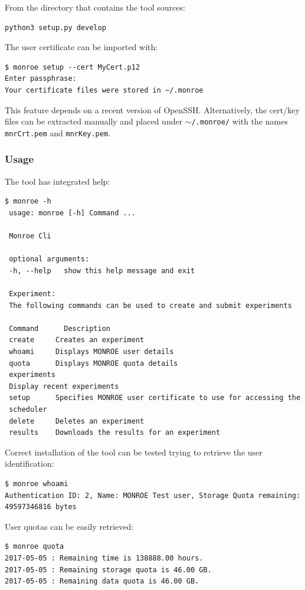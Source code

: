 \documentclass[a4paper,10pt]{article}
\newcommand{\VerbatimFont}{\footnotesize}
\newcommand{\identifier}[1]{{\texttt{\small{#1}}}}
\begin{document}
\noindent From the directory that contains the tool sources:
{\VerbatimFont\begin{verbatim}
python3 setup.py develop
\end{verbatim}}

\noindent The user certificate can be imported with:
{\VerbatimFont\begin{verbatim}
$ monroe setup --cert MyCert.p12
Enter passphrase:
Your certificate files were stored in ~/.monroe
\end{verbatim}}
This feature depends on a recent version of OpenSSH.
Alternatively, the cert/key files can be extracted manually and placed under \identifier{$\sim$/.monroe/}  with the names \identifier{mnrCrt.pem} and \identifier{mnrKey.pem}.

\subsubsection{Usage}

The tool has integrated help:
{\VerbatimFont\begin{verbatim}
$ monroe -h
 usage: monroe [-h] Command ...
 
 Monroe Cli
 
 optional arguments:
 -h, --help   show this help message and exit
 
 Experiment:
 The following commands can be used to create and submit experiments
 
 Command      Description
 create     Creates an experiment
 whoami     Displays MONROE user details
 quota      Displays MONROE quota details
 experiments
 Display recent experiments
 setup      Specifies MONROE user certificate to use for accessing the
 scheduler
 delete     Deletes an experiment
 results    Downloads the results for an experiment
\end{verbatim}}

\noindent Correct installation of the tool can be tested trying to retrieve the user identification:
{\VerbatimFont\begin{verbatim}
$ monroe whoami
Authentication ID: 2, Name: MONROE Test user, Storage Quota remaining: 49597346816 bytes
\end{verbatim}}

\noindent User quotas can be easily retrieved:
{\VerbatimFont\begin{verbatim}
$ monroe quota
2017-05-05 : Remaining time is 138888.00 hours.
2017-05-05 : Remaining storage quota is 46.00 GB.
2017-05-05 : Remaining data quota is 46.00 GB.
\end{verbatim}}
\end{document}
